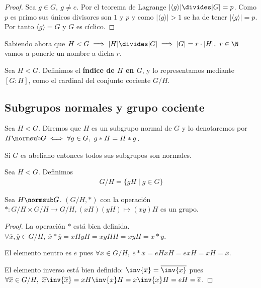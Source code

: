\begin{proof}
	Sea $g \in G,\ g \neq e$. Por el teorema de Lagrange $|\langle g \rangle| \divides |G| = p$. Como $p$ es primo sus únicos divisores son $1$ y $p$ y como $|\langle g \rangle| > 1$ se ha de tener $|\langle g \rangle| = p$. Por tanto $\langle g \rangle = G$ y $G$ es cíclico. 
\end{proof}

Sabiendo ahora que $H < G \implies |H| \divides |G| \implies |G| = r \cdot |H|,\ r \in \N$ vamos a ponerle un nombre a dicha $r$.


\begin{dfn}
	Sea $H < G$. Definimos el \textbf{índice de $H$ en $G$}, y lo representamos mediante $[G:H]$, como el cardinal del conjunto cociente $G/H$. \cite{dor96}
\end{dfn}

\subsection{Subgrupos normales y grupo cociente}

\begin{dfn}
	Sea $H < G$. Diremos que $H$ es un subgrupo normal de $G$ y lo denotaremos por $H \normsub G \iff \forall g \in G,\ g\ast H = H \ast g$.  
\end{dfn}

\begin{pro}
	Si $G$ es abeliano entonces todos sus subgrupos son normales.
\end{pro}


\begin{dfn}
	Sea $H < G$. Definimos
	\begin{align}
	G/H = \{gH \mid g \in G\}
	\end{align}
\end{dfn}

\begin{pro}
	Sea $H \normsub G$. $(G/H, \ast)$ con la operación $\ast: G/H \times G/H \to G/H, (xH)(yH) \mapsto (xy)H$ es un grupo.
\end{pro}

\begin{proof}
	La operación $\ast$ está bien definida. $\forall \overline{x}, \overline{y} \in G/H,\ \overline{x} \ast \overline{y} = xHyH = xyHH = xyH = \overline{x \ast y}$.
	
	El elemento neutro es $\overline{e}$ pues $\forall \overline{x} \in G/H,\ \overline{e} \ast \overline{x} = eHxH = exH = xH = \overline{x}$.
	
	El elemento inverso está bien definido: $\inv{\overline{x}} = \overline{\inv{x}}$ pues $\forall \overline{x} \in G/H,\ \overline{x}\inv{\overline{x}} = xH \inv{x}H = x\inv{x}H = eH = \overline{e}$.
\end{proof}


